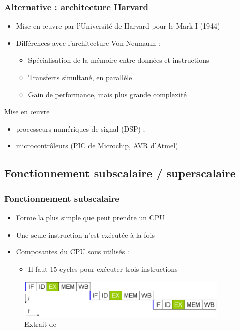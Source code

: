 \begin{frame}
\frametitle{Alternative : architecture Harvard \cite{wp-harvard}}
\begin{itemize}
\item Mise en œuvre par l'Université de Harvard pour le Mark I (1944)
\item Différences avec l'architecture Von Neumann :
\begin{itemize}
\item Spécialisation de la mémoire entre données et instructions
\item Transferts simultané, en parallèle 
\item Gain de performance, mais plus grande complexité
\end{itemize}
\end{itemize}
\begin{exampleblock}{Mise en œuvre}
\begin{itemize}
\item processeurs numériques de signal (DSP) ;
\item microcontrôleurs (PIC de Microchip, AVR d'Atmel).
\end{itemize}

\end{exampleblock}

\end{frame}


\subsection{Fonctionnement subscalaire / superscalaire}

\begin{frame}
\frametitle{Fonctionnement subscalaire}
\begin{itemize}
\item  Forme la plus simple que peut prendre un CPU
\item Une seule instruction n'est exécutée à la fois
\item Composantes du CPU sous utilisés :
\begin{itemize}
\item Il faut 15 cycles pour exécuter trois instructions
\end{itemize}
\end{itemize}
\begin{figure}
\includegraphics[width=10cm]{../illustration/processeur-fonc_subscalaire.png}
\caption{Extrait de \cite{wp-cpu}}
\end{figure}
\end{frame}

